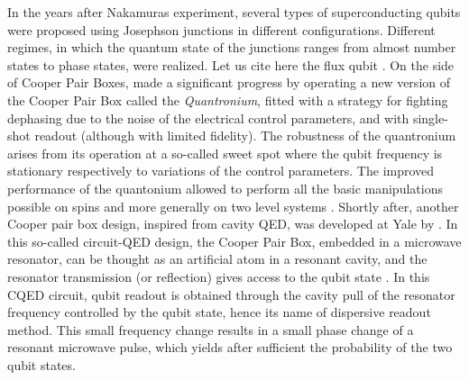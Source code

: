 \smallskip
  
  In the years after Nakamuras experiment, several types of superconducting qubits were proposed using Josephson junctions in different configurations. Different regimes, in which the    quantum state of the junctions  ranges  from almost  number states   to phase states,  were realized.  Let us cite here the flux qubit \citep{mooij_josephson_1999, chiorescu_coherent_2003}.  On the side of Cooper Pair Boxes,  \cite{vion_manipulating_2002} made a significant progress  by operating    a  new   version of the Cooper Pair Box called the {\it Quantronium},  fitted with a strategy for fighting dephasing  due to the noise of the electrical control parameters,  and with single-shot readout (although with limited fidelity). The robustness of the quantronium arises from  its operation at a so-called sweet spot where the qubit  frequency  is stationary respectively to variations of the control parameters. The improved performance of the quantonium allowed to perform all the basic manipulations possible on spins and more generally on  two level systems  \citep{collin_nmr-like_2004}.  Shortly after, another   Cooper pair box design, inspired from cavity QED, was developed at Yale by \cite{wallraff_strong_2004}. In this so-called circuit-QED design, the Cooper Pair Box, embedded in a microwave resonator, can be thought as an artificial atom in a resonant cavity, and the resonator transmission (or reflection)   gives access to the qubit state \citep{blais_cavity_2004}. In this CQED circuit, qubit readout is obtained through the   cavity pull of the resonator frequency controlled by the qubit state, hence its name of dispersive readout method. This small frequency change results in a small phase change of a resonant microwave pulse, which yields after sufficient the probability of the two qubit states.  

\smallskip
	
